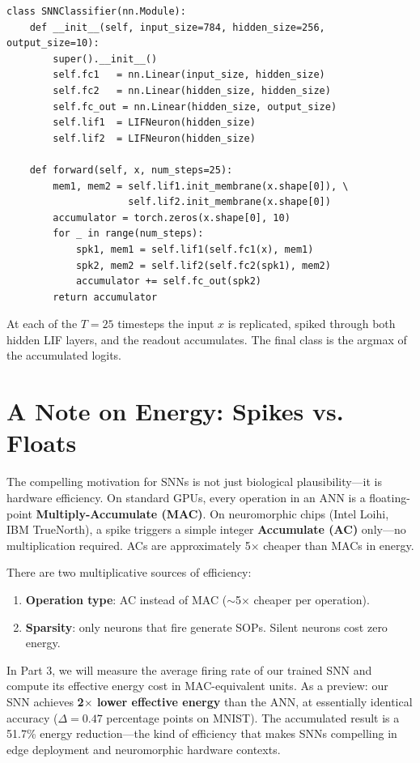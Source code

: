 \documentclass[12pt]{article}
\begin{document}
\begin{lstlisting}
class SNNClassifier(nn.Module):
    def __init__(self, input_size=784, hidden_size=256, output_size=10):
        super().__init__()
        self.fc1   = nn.Linear(input_size, hidden_size)
        self.fc2   = nn.Linear(hidden_size, hidden_size)
        self.fc_out = nn.Linear(hidden_size, output_size)
        self.lif1  = LIFNeuron(hidden_size)
        self.lif2  = LIFNeuron(hidden_size)

    def forward(self, x, num_steps=25):
        mem1, mem2 = self.lif1.init_membrane(x.shape[0]), \
                     self.lif2.init_membrane(x.shape[0])
        accumulator = torch.zeros(x.shape[0], 10)
        for _ in range(num_steps):
            spk1, mem1 = self.lif1(self.fc1(x), mem1)
            spk2, mem2 = self.lif2(self.fc2(spk1), mem2)
            accumulator += self.fc_out(spk2)
        return accumulator
\end{lstlisting}

At each of the $T=25$ timesteps the input $x$ is replicated, spiked through both hidden LIF layers, and the readout accumulates. The final class is the argmax of the accumulated logits.

\section*{A Note on Energy: Spikes vs. Floats}
The compelling motivation for SNNs is not just biological plausibility—it is hardware efficiency. On standard GPUs, every operation in an ANN is a floating-point \textbf{Multiply-Accumulate (MAC)}. On neuromorphic chips (Intel Loihi, IBM TrueNorth), a spike triggers a simple integer \textbf{Accumulate (AC)} only—no multiplication required. ACs are approximately 5$\times$ cheaper than MACs in energy.

There are two multiplicative sources of efficiency:
\begin{enumerate}
    \item \textbf{Operation type}: AC instead of MAC ($\sim$5$\times$ cheaper per operation).
    \item \textbf{Sparsity}: only neurons that fire generate SOPs. Silent neurons cost zero energy.
\end{enumerate}

In Part 3, we will measure the average firing rate of our trained SNN and compute its effective energy cost in MAC-equivalent units. As a preview: our SNN achieves \textbf{2$\times$ lower effective energy} than the ANN, at essentially identical accuracy ($\Delta = 0.47$ percentage points on MNIST). The accumulated result is a 51.7\% energy reduction—the kind of efficiency that makes SNNs compelling in edge deployment and neuromorphic hardware contexts.
\end{document}
